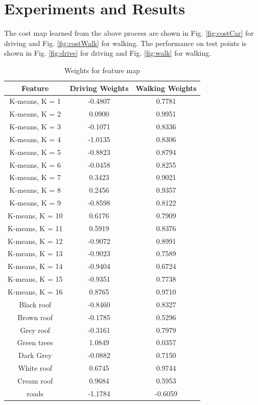 \documentclass[fleqn,10pt]{SelfArx} %
\begin{document}
\section{Experiments and Results}
\label{sec:results}
The cost map learned from the above process are shown in Fig. \ref{fig:costCar} for driving and Fig. \ref{fig:costWalk} for walking. The performance on test points is shown in Fig. \ref{fig:drive} for driving and Fig. \ref{fig:walk} for walking.      

\begin{table}
\caption{Weights for feature map}
\label{tab:weights}
\centering
\begin{tabular}{ccc}
\toprule
Feature & Driving Weights & Walking Weights \\ 
\midrule
K-means, K = 1 & -0.4807 & 0.7781 \\ 
\midrule
K-means, K = 2 & 0.0900 & 0.9951 \\ 
\midrule
K-means, K = 3 & -0.1071 & 0.8336 \\ 
\midrule
K-means, K = 4 & -1.0135 & 0.8306 \\ 
\midrule
K-means, K = 5 & -0.8823 & 0.8794 \\ 
\midrule
K-means, K = 6 & -0.0458 & 0.8255 \\ 
\midrule
K-means, K = 7 & 0.3423 & 0.9021 \\ 
\midrule
K-means, K = 8 & 0.2456 & 0.9357 \\ 
\midrule
K-means, K = 9 & -0.8598 & 0.8122 \\ 
\midrule
K-means, K = 10 & 0.6176 & 0.7909 \\ 
\midrule
K-means, K = 11 & 0.5919 & 0.8376 \\ 
\midrule
K-means, K = 12 & -0.9072 & 0.8991 \\ 
\midrule
K-means, K = 13 & -0.9023 & 0.7589 \\ 
\midrule
K-means, K = 14 & -0.9404 & 0.6724 \\ 
\midrule
K-means, K = 15 & -0.9351 & 0.7738 \\ 
\midrule
K-means, K = 16 & 0.8765 & 0.9710 \\ 
\midrule
Black roof & -0.8460 & 0.8327 \\ 
\midrule
Brown roof & -0.1785 & 0.5296 \\ 
\midrule
Grey roof & -0.3161 & 0.7979 \\ 
\midrule
Green trees & 1.0849 & 0.0357 \\ 
\midrule
Dark Grey & -0.0882 & 0.7150 \\ 
\midrule
White roof & 0.6745 & 0.9744 \\ 
\midrule
Cream roof & 0.9684 & 0.5953 \\ 
\midrule
roads & -1.1784 & -0.6059 \\ 
\bottomrule
\end{tabular} 
\end{table}
\end{document}
